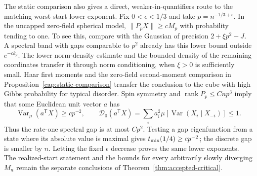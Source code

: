 \begin{remark}\label{cap:lower-test}
The static comparison also gives a direct, weaker-in-quantifiers route
to the matching worst-start lower exponent.  Fix $0<\epsilon<1/3$ and take
$p=n^{-1/3+\epsilon}$.  In the uncapped zero-field spherical model,
$\|P_pX\|\ge cM_p$ with probability tending to one.  To see this,
compare with the Gaussian of precision $2+\xi p^2-J$.  A spectral band
with gaps comparable to $p^2$ already has this lower bound outside
$e^{-ck_p}$.  The lower norm-density estimate and the bounded density
of the remaining coordinates transfer it through norm conditioning,
when $\xi>0$ is sufficiently small.  Haar first moments and the
zero-field second-moment comparison in
Proposition~\ref{cap:static-comparison} transfer the conclusion to the cube
with high Gibbs probability for typical disorder.  Spin symmetry and
$\operatorname{rank}P_p\le Cnp^3$ imply that some Euclidean unit vector
$a$ has
\[
 \operatorname{Var}_\mu(a^{\mathsf T}X)\ge c p^{-2},
 \qquad
 \mathcal D_0(a^{\mathsf T}X)
 =\sum_i a_i^2\mu[\operatorname{Var}(X_i\mid X_{-i})]\le1.
\]
Thus the rate-one spectral gap is at most $Cp^2$.  Testing a gap
eigenfunction from a state where its absolute value is maximal gives
$t_{\rm mix}(1/4)\ge c p^{-2}$; the discrete gap is smaller by $n$.
Letting the fixed $\epsilon$ decrease proves the same lower exponents.
The realized-start statement and the bounds for every arbitrarily slowly
diverging $M_n$ remain the separate conclusions of
Theorem~\ref{thm:accepted-critical}.
\end{remark}
